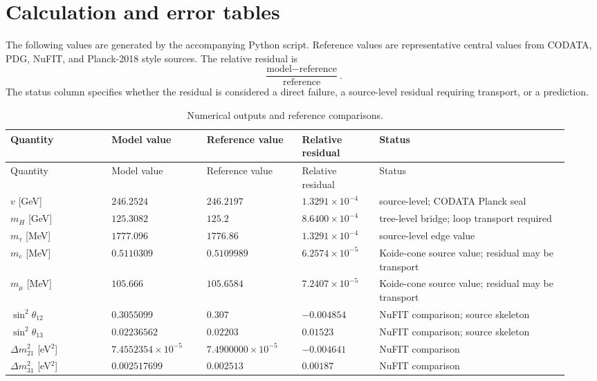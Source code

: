 \documentclass[11pt]{article}
\begin{document}
\section{Calculation and error tables}
\label{sec:tables}

The following values are generated by the accompanying Python script. Reference values are representative central values from CODATA, PDG, NuFIT, and Planck-2018 style sources. The relative residual is
\[
\frac{\text{model}-\text{reference}}{\text{reference}}.
\]
The status column specifies whether the residual is considered a direct failure, a source-level residual requiring transport, or a prediction.

\begin{landscape}
\small
\begin{longtable}{p{0.17\linewidth}p{0.16\linewidth}p{0.16\linewidth}p{0.13\linewidth}p{0.32\linewidth}}
\caption{Numerical outputs and reference comparisons.}\\
\toprule
Quantity & Model value & Reference value & Relative residual & Status\\
\midrule
\endfirsthead
\toprule
Quantity & Model value & Reference value & Relative residual & Status\\
\midrule
\endhead
$v$ [GeV] & $246.2524$ & $246.2197$ & $1.3291\times 10^{-4}$ & source-level; CODATA Planck seal \\
$m_H$ [GeV] & $125.3082$ & $125.2$ & $8.6400\times 10^{-4}$ & tree-level bridge; loop transport required \\
$m_\tau$ [MeV] & $1777.096$ & $1776.86$ & $1.3291\times 10^{-4}$ & source-level edge value \\
$m_e$ [MeV] & $0.5110309$ & $0.5109989$ & $6.2574\times 10^{-5}$ & Koide-cone source value; residual may be transport \\
$m_\mu$ [MeV] & $105.666$ & $105.6584$ & $7.2407\times 10^{-5}$ & Koide-cone source value; residual may be transport \\
$\sin^2\theta_{12}$ & $0.3055099$ & $0.307$ & $-0.004854$ & NuFIT comparison; source skeleton \\
$\sin^2\theta_{13}$ & $0.02236562$ & $0.02203$ & $0.01523$ & NuFIT comparison; source skeleton \\
$\Delta m^2_{21}$ [eV$^2$] & $7.4552354\times 10^{-5}$ & $7.4900000\times 10^{-5}$ & $-0.004641$ & NuFIT comparison \\
$\Delta m^2_{31}$ [eV$^2$] & $0.002517699$ & $0.002513$ & $0.00187$ & NuFIT comparison \\

\end{longtable}
\end{landscape}
\end{document}
